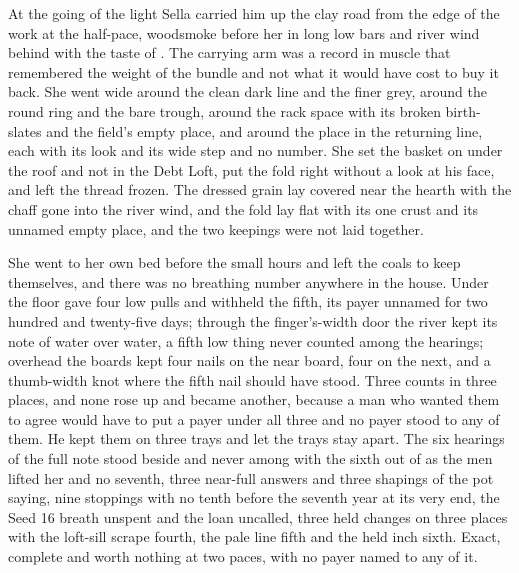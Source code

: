 \scenebreak

At the going of the light Sella carried him up the clay road from the edge of the work at the half-pace, woodsmoke before her in long low bars and river wind behind with the taste of . The carrying arm was a record in muscle that remembered the weight of the bundle and not what it would have cost to buy it back. She went wide around the clean dark line and the finer grey, around the round ring and the bare trough, around the rack space with its broken birth-slates and the field's empty place, and around the place in the returning line, each with its look and its wide step and no number. She set the basket on  under the roof and not in the Debt Loft, put the fold right without a look at his face, and left the thread frozen. The dressed grain lay covered near the hearth with the chaff gone into the river wind, and the fold lay flat with its one crust and its unnamed empty place, and the two keepings were not laid together.

She went to her own bed before the small hours and left the coals to keep themselves, and there was no breathing number anywhere in the house. Under the floor  gave four low pulls and withheld the fifth, its payer unnamed for two hundred and twenty-five days; through the finger's-width door the river kept its note of water over water, a fifth low thing never counted among the hearings; overhead the boards kept four nails on the near board, four on the next, and a thumb-width knot where the fifth nail should have stood. Three counts in three places, and none rose up and became another, because a man who wanted them to agree would have to put a payer under all three and no payer stood to any of them. He kept them on three trays and let the trays stay apart. The six hearings of the full note stood beside and never among with the sixth out of  as the men lifted her and no seventh, three near-full answers and three shapings of the pot saying, nine stoppings with no tenth before the seventh year at its very end, the Seed 16 breath unspent and the loan uncalled, three held changes on three places with the loft-sill scrape fourth, the pale line fifth and the held inch sixth. Exact, complete and worth nothing at two paces, with no payer named to any of it.

